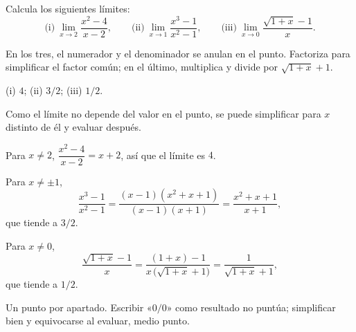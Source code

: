 %

\begin{exercise}
Calcula los siguientes límites:
\[
  \text{(i)}\ \lim_{x \to 2} \frac{x^2 - 4}{x - 2} ,
  \qquad
  \text{(ii)}\ \lim_{x \to 1} \frac{x^3 - 1}{x^2 - 1} ,
  \qquad
  \text{(iii)}\ \lim_{x \to 0} \frac{\sqrt{1 + x} - 1}{x} .
\]


\begin{hint}
En los tres, el numerador y el denominador se anulan en el punto. Factoriza
para simplificar el factor común; en el último, multiplica y divide por
$\sqrt{1 + x} + 1$.
\end{hint}

\begin{answer}
(i) $4$; (ii) $3/2$; (iii) $1/2$.
\end{answer}

\begin{solution}
Como el límite no depende del valor en el punto, se puede simplificar para
$x$ distinto de él y evaluar después.
\begin{parts}
  \item Para $x \neq 2$, $\dfrac{x^2 - 4}{x - 2} = x + 2$, así que el límite
        es $4$.
  \item Para $x \neq \pm 1$,
        \[
          \frac{x^3 - 1}{x^2 - 1}
          = \frac{(x - 1)(x^2 + x + 1)}{(x - 1)(x + 1)}
          = \frac{x^2 + x + 1}{x + 1} ,
        \]
        que tiende a $3/2$.
  \item Para $x \neq 0$,
        \[
          \frac{\sqrt{1 + x} - 1}{x}
          = \frac{(1 + x) - 1}{x\,\bigl(\sqrt{1 + x} + 1\bigr)}
          = \frac{1}{\sqrt{1 + x} + 1} ,
        \]
        que tiende a $1/2$.
\end{parts}
\end{solution}

\begin{marking}
Un punto por apartado. Escribir «$0/0$» como resultado no puntúa;
simplificar bien y equivocarse al evaluar, medio punto.
\end{marking}
\end{exercise}
